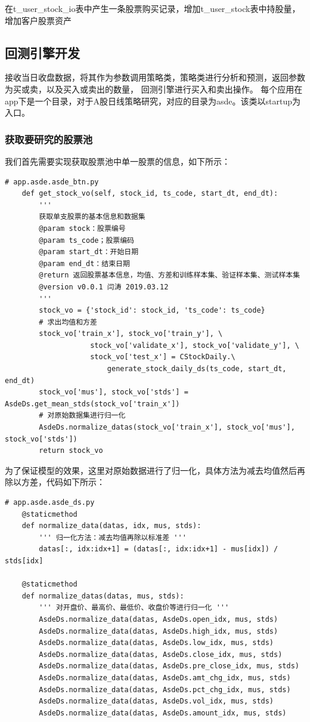 \documentclass{article}
\begin{document}
在t\_user\_stock\_io表中产生一条股票购买记录，增加t\_user\_stock表中持股量，增加客户股票资产


\subsection{回测引擎开发}
接收当日收盘数据，将其作为参数调用策略类，策略类进行分析和预测，返回参数为买或卖，以及买入或卖出的数量，
回测引擎进行买入和卖出操作。
每个应用在app下是一个目录，对于A股日线策略研究，对应的目录为asde。该类以startup为入口。
\subsubsection{获取要研究的股票池}
我们首先需要实现获取股票池中单一股票的信息，如下所示：
\begin{lstlisting}
# app.asde.asde_btn.py
    def get_stock_vo(self, stock_id, ts_code, start_dt, end_dt):
        '''
        获取单支股票的基本信息和数据集
        @param stock：股票编号
        @param ts_code；股票编码
        @param start_dt：开始日期
        @param end_dt：结束日期
        @return 返回股票基本信息，均值、方差和训练样本集、验证样本集、测试样本集
        @version v0.0.1 闫涛 2019.03.12
        '''
        stock_vo = {'stock_id': stock_id, 'ts_code': ts_code}
        # 求出均值和方差
        stock_vo['train_x'], stock_vo['train_y'], \
                    stock_vo['validate_x'], stock_vo['validate_y'], \
                    stock_vo['test_x'] = CStockDaily.\
                        generate_stock_daily_ds(ts_code, start_dt, end_dt)
        stock_vo['mus'], stock_vo['stds'] = AsdeDs.get_mean_stds(stock_vo['train_x'])
        # 对原始数据集进行归一化
        AsdeDs.normalize_datas(stock_vo['train_x'], stock_vo['mus'], stock_vo['stds'])
        return stock_vo
\end{lstlisting}
为了保证模型的效果，这里对原始数据进行了归一化，具体方法为减去均值然后再除以方差，代码如下所示：
\begin{lstlisting}
# app.asde.asde_ds.py
    @staticmethod
    def normalize_data(datas, idx, mus, stds):
        ''' 归一化方法：减去均值再除以标准差 '''
        datas[:, idx:idx+1] = (datas[:, idx:idx+1] - mus[idx]) / stds[idx]
        
    @staticmethod
    def normalize_datas(datas, mus, stds):
        ''' 对开盘价、最高价、最低价、收盘价等进行归一化 '''
        AsdeDs.normalize_data(datas, AsdeDs.open_idx, mus, stds)
        AsdeDs.normalize_data(datas, AsdeDs.high_idx, mus, stds)
        AsdeDs.normalize_data(datas, AsdeDs.low_idx, mus, stds)
        AsdeDs.normalize_data(datas, AsdeDs.close_idx, mus, stds)
        AsdeDs.normalize_data(datas, AsdeDs.pre_close_idx, mus, stds)
        AsdeDs.normalize_data(datas, AsdeDs.amt_chg_idx, mus, stds)
        AsdeDs.normalize_data(datas, AsdeDs.pct_chg_idx, mus, stds)
        AsdeDs.normalize_data(datas, AsdeDs.vol_idx, mus, stds)
        AsdeDs.normalize_data(datas, AsdeDs.amount_idx, mus, stds)

\end{lstlisting}
\end{document}
